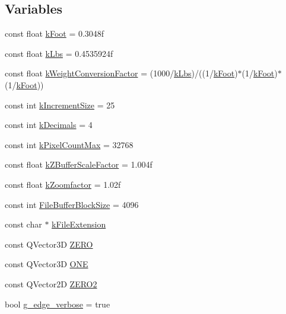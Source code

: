 \subsection*{Variables}
\begin{DoxyCompactItemize}
\item 
const float \hyperlink{namespaceShipCAD_a8c1484188fed1e735c5a94f64a6817ab}{k\-Foot} = 0.\-3048f
\item 
const float \hyperlink{namespaceShipCAD_ad6937518d9742e268b279000d1e7a509}{k\-Lbs} = 0.\-4535924f
\item 
const float \hyperlink{namespaceShipCAD_aa4319c8e7adfa68048f95c1614984036}{k\-Weight\-Conversion\-Factor} = (1000/\hyperlink{namespaceShipCAD_ad6937518d9742e268b279000d1e7a509}{k\-Lbs})/((1/\hyperlink{namespaceShipCAD_a8c1484188fed1e735c5a94f64a6817ab}{k\-Foot})$\ast$(1/\hyperlink{namespaceShipCAD_a8c1484188fed1e735c5a94f64a6817ab}{k\-Foot})$\ast$(1/\hyperlink{namespaceShipCAD_a8c1484188fed1e735c5a94f64a6817ab}{k\-Foot}))
\item 
const int \hyperlink{namespaceShipCAD_a1c0de7dc4306d7908bd8c6f7ff69ecdc}{k\-Increment\-Size} = 25
\item 
const int \hyperlink{namespaceShipCAD_ac88ffd27e117a3e612997a36a5d4616d}{k\-Decimals} = 4
\item 
const int \hyperlink{namespaceShipCAD_ac8176e9d12f859826fb131b7febb8c8a}{k\-Pixel\-Count\-Max} = 32768
\item 
const float \hyperlink{namespaceShipCAD_a519c591e5f5e3f60603b3133a4a2094e}{k\-Z\-Buffer\-Scale\-Factor} = 1.\-004f
\item 
const float \hyperlink{namespaceShipCAD_a80babe3fef93f1117e1c410f8d3c22c2}{k\-Zoomfactor} = 1.\-02f
\item 
const int \hyperlink{namespaceShipCAD_afeba968c9abef53c8d1ff63855076dec}{File\-Buffer\-Block\-Size} = 4096
\item 
const char $\ast$ \hyperlink{namespaceShipCAD_a76ec58fc6d779982def49fface17b1a4}{k\-File\-Extension}
\item 
const Q\-Vector3\-D \hyperlink{namespaceShipCAD_a949bc53a1634b268b43de672807480fb}{Z\-E\-R\-O}
\item 
const Q\-Vector3\-D \hyperlink{namespaceShipCAD_ad454d484187a50b115d2e77055617816}{O\-N\-E}
\item 
const Q\-Vector2\-D \hyperlink{namespaceShipCAD_ab47218dccdf4c94d5989b2e5b13d8603}{Z\-E\-R\-O2}
\item 
bool \hyperlink{namespaceShipCAD_ad5a157bd082e37a863f05b7c54a1d7cc}{g\-\_\-edge\-\_\-verbose} = true

\end{DoxyCompactItemize}
